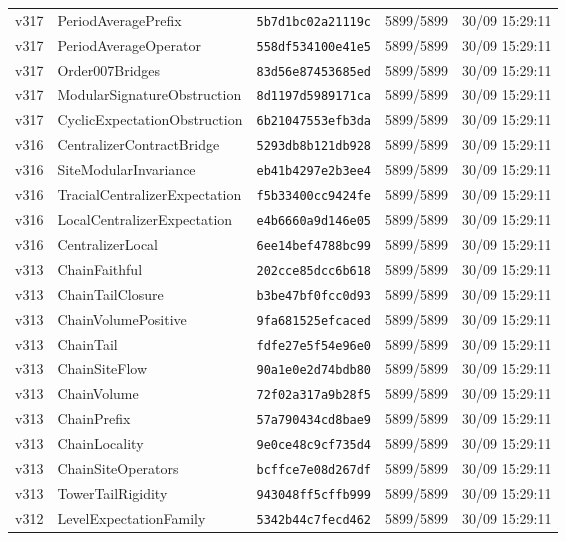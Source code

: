 \documentclass[11pt]{article}
\theoremstyle{definition}\newtheorem{deriv}{Derivation}
\begin{document}
{\begin{longtable}{@{}lllll@{}}
v317 & PeriodAveragePrefix & \texttt{5b7d1bc02a21119c} & 5899/5899 & 30/09 15:29:11 \\
v317 & PeriodAverageOperator & \texttt{558df534100e41e5} & 5899/5899 & 30/09 15:29:11 \\
v317 & Order007Bridges & \texttt{83d56e87453685ed} & 5899/5899 & 30/09 15:29:11 \\
v317 & ModularSignatureObstruction & \texttt{8d1197d5989171ca} & 5899/5899 & 30/09 15:29:11 \\
v317 & CyclicExpectationObstruction & \texttt{6b21047553efb3da} & 5899/5899 & 30/09 15:29:11 \\
v316 & CentralizerContractBridge & \texttt{5293db8b121db928} & 5899/5899 & 30/09 15:29:11 \\
v316 & SiteModularInvariance & \texttt{eb41b4297e2b3ee4} & 5899/5899 & 30/09 15:29:11 \\
v316 & TracialCentralizerExpectation & \texttt{f5b33400cc9424fe} & 5899/5899 & 30/09 15:29:11 \\
v316 & LocalCentralizerExpectation & \texttt{e4b6660a9d146e05} & 5899/5899 & 30/09 15:29:11 \\
v316 & CentralizerLocal & \texttt{6ee14bef4788bc99} & 5899/5899 & 30/09 15:29:11 \\
v313 & ChainFaithful & \texttt{202cce85dcc6b618} & 5899/5899 & 30/09 15:29:11 \\
v313 & ChainTailClosure & \texttt{b3be47bf0fcc0d93} & 5899/5899 & 30/09 15:29:11 \\
v313 & ChainVolumePositive & \texttt{9fa681525efcaced} & 5899/5899 & 30/09 15:29:11 \\
v313 & ChainTail & \texttt{fdfe27e5f54e96e0} & 5899/5899 & 30/09 15:29:11 \\
v313 & ChainSiteFlow & \texttt{90a1e0e2d74bdb80} & 5899/5899 & 30/09 15:29:11 \\
v313 & ChainVolume & \texttt{72f02a317a9b28f5} & 5899/5899 & 30/09 15:29:11 \\
v313 & ChainPrefix & \texttt{57a790434cd8bae9} & 5899/5899 & 30/09 15:29:11 \\
v313 & ChainLocality & \texttt{9e0ce48c9cf735d4} & 5899/5899 & 30/09 15:29:11 \\
v313 & ChainSiteOperators & \texttt{bcffce7e08d267df} & 5899/5899 & 30/09 15:29:11 \\
v313 & TowerTailRigidity & \texttt{943048ff5cffb999} & 5899/5899 & 30/09 15:29:11 \\
v312 & LevelExpectationFamily & \texttt{5342b44c7fecd462} & 5899/5899 & 30/09 15:29:11 \\

\end{longtable}}
\end{document}
